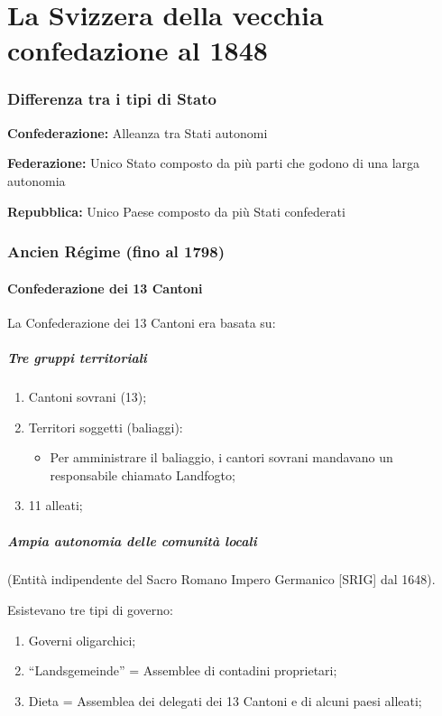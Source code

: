 \documentclass{article}
\begin{document}
\newpage
\part{La Svizzera della vecchia confedazione al 1848}
\section{Differenza tra i tipi di Stato}

\textbf{Confederazione:} Alleanza tra Stati autonomi

\textbf{Federazione:} Unico Stato composto da più parti che godono di una larga autonomia

\textbf{Repubblica:} Unico Paese composto da più Stati confederati

\section{Ancien Régime (fino al 1798)}

\subsection{Confederazione dei 13 Cantoni}

La Confederazione dei 13 Cantoni era basata su:

\subsubsection{Tre gruppi territoriali}
\begin{enumerate}
    \item Cantoni sovrani (13);
    \item Territori soggetti (baliaggi):
        \begin{itemize}
            \item Per amministrare il baliaggio, i cantori sovrani mandavano un responsabile
                chiamato Landfogto;
        \end{itemize}
    \item 11 alleati;
\end{enumerate}

\subsubsection{Ampia autonomia delle comunità locali}
(Entità indipendente del Sacro Romano Impero Germanico [SRIG] dal 1648).

Esistevano tre tipi di governo:
\begin{enumerate}
    \item Governi oligarchici;
    \item “Landsgemeinde” = Assemblee di contadini proprietari;
    \item Dieta = Assemblea dei delegati dei 13 Cantoni e di alcuni paesi alleati;
\end{enumerate}
\end{document}
